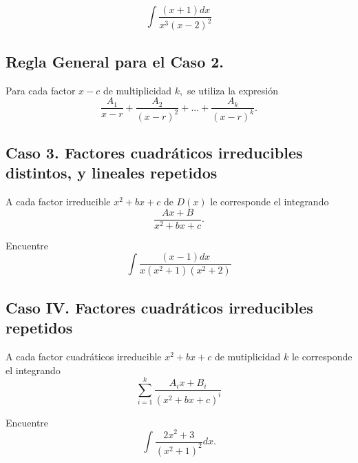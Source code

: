  \begin{problema}
  \label{ayr:33.8}
  $$
  \int \dfrac{(x+1)dx}{x^{3}(x-2)^{2}}
  $$
 \end{problema}




\subsection{Regla General para el Caso 2.}
 Para cada factor $x-c$ de multiplicidad $k,$ se utiliza la expresión
 $$
 \dfrac{A_{1}}{x-r}+\dfrac{A_{2}}{(x-r)^{2}}+...+\dfrac{A_{k}}{(x-r)^{k}}.
 $$



\subsection{Caso 3. Factores cuadráticos irreducibles distintos, y lineales repetidos}
 A cada factor irreducible $x^{2}+bx+c$ de $D(x)$ le corresponde el integrando
 $$
 \dfrac{Ax+B}{x^{2}+bx+c}.
 $$



 \begin{problema}
  Encuentre $$
  \int \dfrac{(x-1)dx}{x(x^{2}+1)(x^{2}+2)}
  $$
 \end{problema}




\subsection{Caso IV. Factores cuadráticos irreducibles repetidos}
 
 A cada factor cuadráticos irreducible $x^{2}+bx+c$ de mutiplicidad $k$ le corresponde el integrando
 $$
 \sum_{i=1}^{k}\dfrac{A_{i}x+B_{i}}{(x^{2}+bx+c)^{i}}
 $$
 



 \begin{problema}
  Encuentre $$\int\dfrac{2x^{2}+3}{(x^{2}+1)^{2}}dx.$$
 \end{problema}


